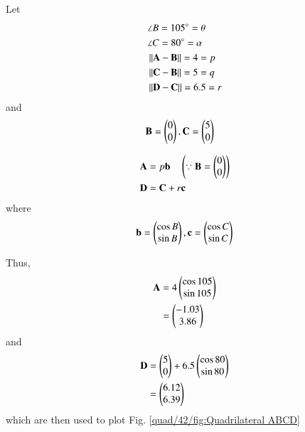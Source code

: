 
Let 
    \begin{align}
    &\angle B= 105\degree=\theta \label{quad/42/eq1}
    \\
    &\angle C= 80\degree=\alpha \label{quad/42/eq2}
    \\
    &\left\lVert\mathbf{A}-\mathbf{B}\right\rVert =4=p \label{quad/42/eq3}
    \\
    &\left\lVert\mathbf{C}-\mathbf{B}\right\rVert =5=q \label{quad/42/eq4}
    \\
     &\left\lVert\mathbf{D}-\mathbf{C}\right\rVert =6.5=r \label{quad/42/eq5}
    \end{align}
and 
\begin{align}
    &\mathbf{B}=\begin{pmatrix}0\\0\end{pmatrix}, \mathbf{C}=\begin{pmatrix}5\\0\end{pmatrix}
\end{align}

\begin{lemma}
\label{quad/42/lemma}
\begin{align}
  & \mathbf{A} = p \mathbf{b}  \quad \left(\because \mathbf{B}=\begin{pmatrix}0\\0\end{pmatrix}\right) \label{quad/42/eq a}
\\
  & \mathbf{D} =\mathbf{C} + r \mathbf{c} \label{quad/42/eq b}
\end{align}
where 
\begin{align}
 \mathbf{b} = \begin{pmatrix}\cos B \\ \sin B \end{pmatrix} ,\mathbf{c} = \begin{pmatrix}\cos C\\ \sin C \end{pmatrix}
\end{align}
\end{lemma}
Thus, 
\begin{align}
 \mathbf{A} &=4\begin{pmatrix}\cos 105 \\\sin 105 \end{pmatrix}
\\
&=\begin{pmatrix}-1.03\\3.86\end{pmatrix}
\end{align}
and 
\begin{align}
\mathbf{D} &=\begin{pmatrix}5\\0\end{pmatrix} + 6.5\begin{pmatrix}\cos 80 \\\sin 80 \end{pmatrix}
\\
&=\begin{pmatrix}6.12\\6.39\end{pmatrix}
\end{align}
which are then used to plot Fig. \ref{quad/42/fig:Quadrilateral ABCD}	
